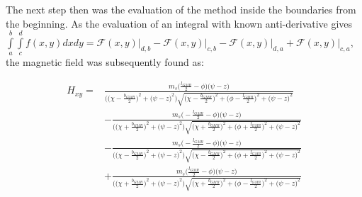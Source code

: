 The next step then was the evaluation of the method inside the boundaries from the beginning. As the evaluation of an integral with known anti-derivative gives
$\int\limits_{a}^{b}\int\limits_{c}^{d}f(x,y)dxdy = \mathcal{F}(x,y)\big|_{d,b} - \mathcal{F}(x,y)\big|_{c,b} - \mathcal{F}(x,y)\big|_{d,a} + \mathcal{F}(x,y)\big|_{c,a}$, the magnetic field was subsequently found as:




\begin{align}
H_{xy} = & \frac{m_s\Big(\frac{l_{GMR}}{2} - \phi\Big)\Big(\psi - z\Big)}{\bigg(\Big(\chi-\frac{b_{GMR}}{2}\Big)^2 +\Big(\psi-z\Big)^2\bigg)\sqrt{ \Big(\chi-\frac{b_{GMR}}{2}\Big)^2 + \Big(\phi-\frac{l_{GMR}}{2}\Big)^2 + \Big(\psi-z\Big)^2}}
\nonumber\\
&-\frac{m_s\Big(-\frac{l_{GMR}}{2} - \phi\Big)\Big(\psi - z\Big)}{\bigg(\Big(\chi+\frac{b_{GMR}}{2}\Big)^2 +\Big(\psi-z\Big)^2\bigg)\sqrt{ \Big(\chi+\frac{b_{GMR}}{2}\Big)^2 + \Big(\phi+\frac{l_{GMR}}{2}\Big)^2 + \Big(\psi-z\Big)^2}}
\nonumber\\
&-\frac{m_s\Big(-\frac{l_{GMR}}{2} - \phi\Big)\Big(\psi - z\Big)}{\bigg(\Big(\chi-\frac{b_{GMR}}{2}\Big)^2 +\Big(\psi-z\Big)^2\bigg)\sqrt{ \Big(\chi-\frac{b_{GMR}}{2}\Big)^2 + \Big(\phi+\frac{l_{GMR}}{2}\Big)^2 + \Big(\psi-z\Big)^2}}
\nonumber\\
&+\frac{m_s\Big(\frac{l_{GMR}}{2} - \phi\Big)\Big(\psi - z\Big)}{\bigg(\Big(\chi+\frac{b_{GMR}}{2}\Big)^2 +\Big(\psi-z\Big)^2\bigg)\sqrt{ \Big(\chi+\frac{b_{GMR}}{2}\Big)^2 + \Big(\phi-\frac{l_{GMR}}{2}\Big)^2 + \Big(\psi-z\Big)^2}}
\end{align}


